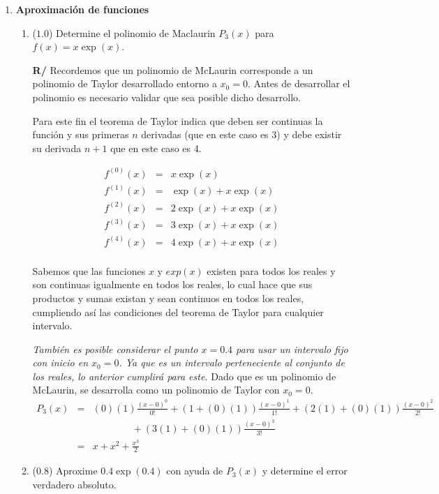 \documentclass[12pt]{article}
\begin{document}
  \begin{enumerate}[leftmargin=*,widest=9]
    \item \textbf{Aproximación de funciones}
    \begin{enumerate}[label=\alph*]
    \item (\(1.0\)) Determine el polinomio de Maclaurin \(P_3(x)\) para \(f(x) = x \exp(x) \).
    
   
   \textbf{R/} Recordemos que un polinomio de McLaurin corresponde a un polinomio de Taylor desarrollado entorno a \(x_0=0\). Antes de desarrollar el polinomio es necesario validar que sea posible dicho desarrollo.
   
   Para este fin el teorema de Taylor indica que deben ser continuas la función y sus primeras \(n\) derivadas (que en este caso es 3) y debe existir su derivada \(n+1\) que en este caso es 4.
   
   \begin{eqnarray*}
   f^{(0)}(x) &=& x \exp(x) \\
   f^{(1)}(x) &=& \exp(x) + x \exp(x) \\
   f^{(2)}(x) &=& 2\exp(x) + x \exp(x) \\
   f^{(3)}(x) &=& 3\exp(x) + x \exp(x) \\
   f^{(4)}(x) &=& 4\exp(x) + x \exp(x) \\
   \end{eqnarray*}
   
   Sabemos que las funciones \(x\) y \(exp(x)\) existen para todos los reales y son continuas igualmente en todos los reales, lo cual hace que sus productos y sumas existan y sean continuos en todos los reales, cumpliendo así las condiciones del teorema de Taylor para cualquier intervalo.
   
\textit{También es posible considerar el punto \(x = 0.4\) para usar un intervalo fijo con inicio en \(x_0=0\). Ya que es un intervalo perteneciente al conjunto de los reales, lo anterior cumplirá para este.}
Dado que es un polinomio de McLaurin, se desarrolla como un polinomio de Taylor con \(x_0=0\).
\begin{eqnarray*}
P_3(x) & = & (0)(1) \frac{(x-0)^0}{0!} + (1 + (0)(1)) \frac{(x-0)^1}{1!} + (2(1) + (0)(1)) \frac{(x-0)^2}{2!} \\
&& \qquad \qquad + (3(1) + (0)(1)) \frac{(x-0)^3}{3!}\\
& = & x + x^2 + \frac{x^3}{2}
\end{eqnarray*}
    \item (\(0.8\)) Aproxime \(0.4 \exp(0.4)\) con ayuda de \(P_3(x)\) y determine el error verdadero absoluto.
    

\end{enumerate}
\end{enumerate}
\end{document}
